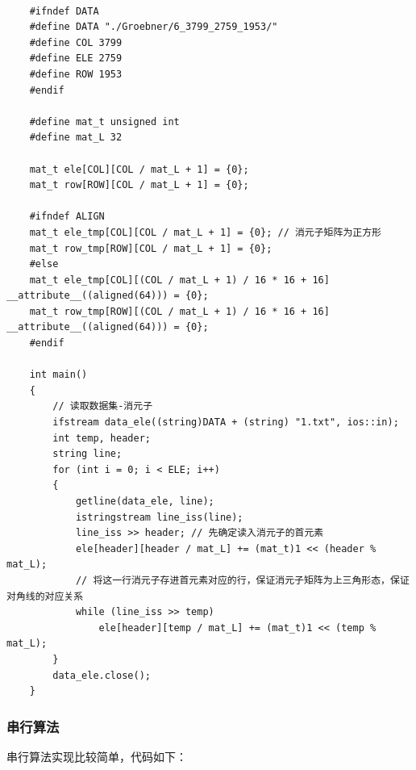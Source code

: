 \documentclass[a4paper]{article}
\begin{document}
\begin{verbatim}

    #ifndef DATA
    #define DATA "./Groebner/6_3799_2759_1953/"
    #define COL 3799
    #define ELE 2759
    #define ROW 1953
    #endif
    
    #define mat_t unsigned int
    #define mat_L 32
    
    mat_t ele[COL][COL / mat_L + 1] = {0};
    mat_t row[ROW][COL / mat_L + 1] = {0};
    
    #ifndef ALIGN
    mat_t ele_tmp[COL][COL / mat_L + 1] = {0}; // 消元子矩阵为正方形
    mat_t row_tmp[ROW][COL / mat_L + 1] = {0};
    #else
    mat_t ele_tmp[COL][(COL / mat_L + 1) / 16 * 16 + 16] __attribute__((aligned(64))) = {0};
    mat_t row_tmp[ROW][(COL / mat_L + 1) / 16 * 16 + 16] __attribute__((aligned(64))) = {0};
    #endif
    
    int main()
    {
        // 读取数据集-消元子
        ifstream data_ele((string)DATA + (string) "1.txt", ios::in);
        int temp, header;
        string line;
        for (int i = 0; i < ELE; i++)
        {
            getline(data_ele, line);
            istringstream line_iss(line);
            line_iss >> header; // 先确定读入消元子的首元素
            ele[header][header / mat_L] += (mat_t)1 << (header % mat_L);
            // 将这一行消元子存进首元素对应的行，保证消元子矩阵为上三角形态，保证对角线的对应关系
            while (line_iss >> temp)
                ele[header][temp / mat_L] += (mat_t)1 << (temp % mat_L);
        }
        data_ele.close();
    }
\end{verbatim}

\subsubsection{串行算法}
串行算法实现比较简单，代码如下：
\end{document}
